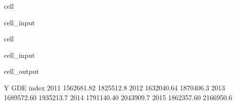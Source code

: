 \documentclass[letterpaper,10pt,english]{jupyterBook}
\begin{document}
\begin{sphinxuseclass}{cell}\begin{sphinxVerbatimInput}

\begin{sphinxuseclass}{cell_input}
\begin{sphinxVerbatim}[commandchars=\\\{\}]
   
\end{sphinxVerbatim}

\end{sphinxuseclass}\end{sphinxVerbatimInput}

\end{sphinxuseclass}
\begin{sphinxuseclass}{cell}\begin{sphinxVerbatimInput}

\begin{sphinxuseclass}{cell_input}
\begin{sphinxVerbatim}[commandchars=\\\{\}]
\PYG{p}{[}\PYG{p}{[}\PYG{p}{]}\PYG{p}{]}  
\end{sphinxVerbatim}

\end{sphinxuseclass}\end{sphinxVerbatimInput}
\begin{sphinxVerbatimOutput}

\begin{sphinxuseclass}{cell_output}
\begin{sphinxVerbatim}[commandchars=\\\{\}]
                Y        GDE
index                       
2011   1562681.82  1825512.8
2012   1632040.64  1870406.3
2013   1689572.60  1935213.7
2014   1791140.40  2043909.7
2015   1862357.60  2166950.6
\end{sphinxVerbatim}

\end{sphinxuseclass}\end{sphinxVerbatimOutput}

\end{sphinxuseclass}
\end{document}
